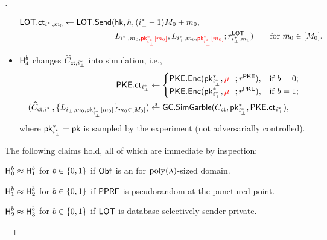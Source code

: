 \begin{proof}[]
\begin{itemize}
\begin{align*}
\LOT.\ct_{i_\bot^\ast,m_0}
&{}\gets\LOT.\Send(\hk,h,(i_\bot^\ast-1)M_0+m_0,\\
&\hphantom{{}\gets\LOT.\Send({}}
\WideNarrow{}{\hspace*{-4em}}
L_{i_\bot^\ast,m_0,{\color{red}\pk^\ast_{i_\bot^\ast}[m_0]}},
L_{i_\bot^\ast,m_0,{\color{red}\pk^\ast_{i_\bot^\ast}[m_0]}};
r^\LOT_{i_\bot^\ast,m_0})
\qquad\textup{for }m_0\in[M_0].
\end{align*}
\item $\Hyb_4^b$ changes $\widehat{C}_{\ct,i_\bot^\ast}$ into simulation, i.e.,
\begin{align*}
\PKE.\ct_{i_\bot^\ast}&{}\gets\begin{cases}
\PKE.\Enc(\pk^\ast_{i_\bot^\ast},{\color{red}\mu_{\phantom{\bot}}};r^\PKE),
&\textup{if }b=0;\\
\PKE.\Enc(\pk^\ast_{i_\bot^\ast},{\color{red}\mu_\bot};r^\PKE),
&\textup{if }b=1;
\end{cases}\\
(\widehat{C}_{\ct,i_\bot^\ast},\{L_{i_\bot,m_0,\pk^\ast_{i_\bot^\ast}[m_0]}\}_{m_0\in[M_0]})
&{}\draws\GC.\SimGarble(C_\ct,\pk^\ast_{i_\bot^\ast},\PKE.\ct_{i_\bot^\ast}),
\end{align*}
where ${\pk^\ast_{i_\bot^\ast}=\pk}$ is sampled by the experiment
(not adversarially controlled).
\end{itemize}
The following claims hold, all of which are immediate by inspection:

\begin{claim}\label{clm:index-hiding-hyb01}
${\Hyb_0^b\approx\Hyb_1^b}$ for ${b\in{\{0,1\}}}$
if $\Obf$ is an {\iO} for $\operatorname{poly}(\lambda)$-sized domain.
\end{claim}

\begin{claim}\label{clm:index-hiding-hyb12}
${\Hyb_1^b\approx\Hyb_2^b}$ for ${b\in{\{0,1\}}}$
if $\PPRF$ is pseudorandom at the punctured point.
\end{claim}

\begin{claim}\label{clm:index-hiding-hyb23}
${\Hyb_2^b\approx\Hyb_3^b}$ for ${b\in{\{0,1\}}}$
if $\LOT$ is database-selectively sender-private.
\end{claim}


\end{proof}
